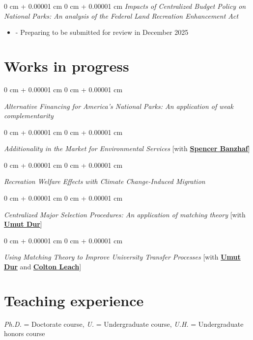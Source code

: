 \documentclass[11pt]{article}
\newenvironment{highlights}{
	\begin{itemize}[
		topsep=0.10 cm,
		parsep=0.10 cm,
		partopsep=0pt,
		itemsep=0pt,
		leftmargin=0 cm + 10pt
		]
	}{
	\end{itemize}
} %
\newenvironment{onecolentry}{
	\begin{adjustwidth}{
			0 cm + 0.00001 cm
		}{
			0 cm + 0.00001 cm
		}
	}{
	\end{adjustwidth}
} %
\begin{document}
\begin{onecolentry}%
	\textit{Impacts of Centralized Budget Policy on National Parks: An analysis of the Federal Land Recreation Enhancement Act}
	\vspace{-1ex}
	\begin{highlights}
		\item[-] Preparing to be submitted for review in December 2025
	\end{highlights}
\end{onecolentry}


\section{Works in progress}%

\begin{onecolentry}
	\textit{Alternative Financing for America's National Parks: An application of weak complementarity}
\end{onecolentry}

\begin{onecolentry}
	\textit{Additionality in the Market for Environmental Services}
	[with \href{https://spencerbanzhaf.wordpress.ncsu.edu/}{\textbf{Spencer Banzhaf}}]
\end{onecolentry}

\begin{onecolentry}
	\textit{Recreation Welfare Effects with Climate Change-Induced Migration}
\end{onecolentry}

\begin{onecolentry}
	\textit{Centralized Major Selection Procedures: An application of matching theory}
	[with \href{https://sites.google.com/site/umutdur/home}{\textbf{Umut Dur}}]
\end{onecolentry}

\begin{onecolentry}
	\textit{Using Matching Theory to Improve University Transfer Processes}
	[with \href{https://sites.google.com/site/umutdur/home}{\textbf{Umut Dur}} and \href{https://www.linkedin.com/in/colton-leach-54a080136}{\textbf{Colton Leach}}]
\end{onecolentry}

\section{Teaching experience}
 {\footnotesize \textit{Ph.D.} = Doctorate course, \textit{U.} = Undergraduate course, \textit{U.H.} = Undergraduate honors course}
\end{document}
